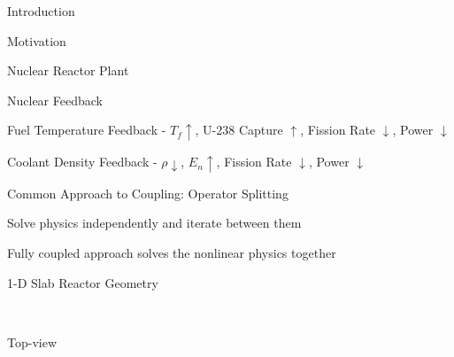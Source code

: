 \documentclass{beamer}
\begin{document}
\begin{section}{Introduction}
\begin{frame}{Motivation}
\end{frame}
\begin{frame}{Nuclear Reactor Plant}
  \scalebox{0.45}{}
  \vfill
\end{frame}
\begin{frame}{Nuclear Feedback}
  \begin{center}
    \scalebox{0.4}{}
    \begin{itemize}
      \begin{scriptsize}
	\item Fuel Temperature Feedback -  $T_{f} \uparrow$, U-238 
	      Capture $\uparrow$, Fission Rate $\downarrow$, 
	      Power $\downarrow$
	\item Coolant Density Feedback - $\rho \downarrow$,
	      $E_{n} \uparrow$, Fission Rate $\downarrow$, 
	      Power $\downarrow$
      \end{scriptsize}
    \end{itemize}
  \end{center}
\end{frame}
\begin{frame}{Common Approach to Coupling: Operator Splitting}
\begin{customlist}{2ex}{0pt}
  \item Solve physics independently and iterate between them
  \begin{center}
    \scalebox{0.6}{}
  \end{center}
  \item Fully coupled approach solves the nonlinear physics together
  \begin{center}
    \scalebox{0.6}{}
  \end{center}
\end{customlist}
\end{frame}
\begin{frame}{1-D Slab Reactor Geometry}
\begin{columns}
  \begin{column}{0.5\textwidth}
  \begin{center}
    \scalebox{0.5}{}
    \\ Top-view

\end{center}
\end{column}
\end{columns}
\end{frame}
\end{section}
\end{document}
